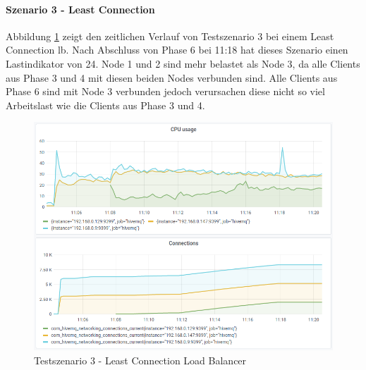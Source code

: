 \paragraph{Szenario 3 - Least Connection}
Abbildung \ref{fig:s3-lc} zeigt den zeitlichen Verlauf von Testszenario 3 bei einem Least Connection \ac{lb}.
Nach Abschluss von Phase 6 bei 11:18 hat dieses Szenario einen Lastindikator von 24.
Node 1 und 2 sind mehr belastet als Node 3, da alle Clients aus Phase 3 und 4 mit diesen beiden Nodes verbunden sind. Alle Clients aus Phase 6 sind mit Node 3 verbunden jedoch verursachen diese nicht so viel Arbeitslast wie die Clients aus Phase 3 und 4.
\begin{figure}
    \centering
    \includegraphics[scale=0.8]{images/s3_lc.png}
    \caption{Testszenario 3 - Least Connection Load Balancer}
    \label{fig:s3-lc}
\end{figure}

